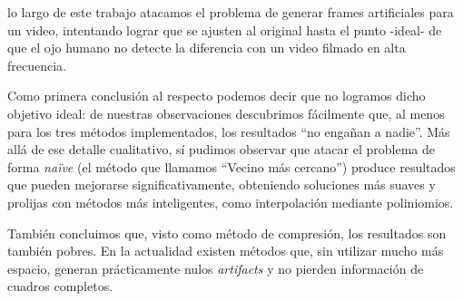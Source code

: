  lo largo de este trabajo atacamos el problema de generar frames artificiales para un video, intentando lograr que se ajusten al original hasta el punto -ideal- de que el ojo humano no detecte la diferencia con un video filmado en alta frecuencia.

Como primera conclusión al respecto podemos decir que no logramos dicho objetivo ideal: de nuestras observaciones descubrimos fácilmente que, al menos para los tres métodos implementados, los resultados ``no engañan a nadie''. Más allá de ese detalle cualitativo, sí pudimos observar que atacar el problema de forma \emph{naïve} (el método que llamamos ``Vecino más cercano'') produce resultados que pueden mejorarse significativamente, obteniendo soluciones más suaves y prolijas con métodos más inteligentes, como interpolación mediante poliniomios.

También concluimos que, visto como método de compresión, los resultados son también pobres. En la actualidad existen métodos que, sin utilizar mucho más espacio, generan prácticamente nulos \emph{artifacts} y no pierden información de cuadros completos.